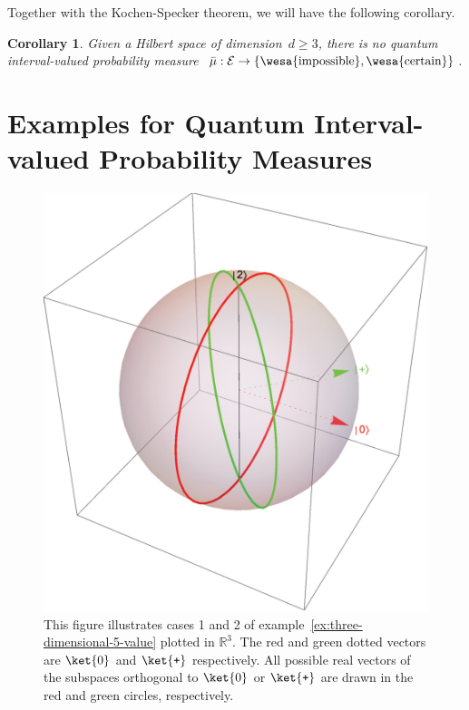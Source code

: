 \documentclass[12pt]{iopart}
\theoremstyle{plain}
\newtheorem{cor}[thm]{Corollary}
\theoremstyle{definition}
\theoremstyle{remark}
\newcommand{\events}{\ensuremath{\mathcal{E}}}
\newcommand{\imposs}{{\mbox{\wesa{impossible}}}}
\newcommand{\necess}{{\mbox{\wesa{certain}}}}
\newcommand{\ps}{\texttt{+}}
\begin{document}
Together with the Kochen-Specker theorem, we will have the following
corollary.

\begin{cor}\label{cor:Kochen-Specker-IVPM}Given a Hilbert space
of dimension~$d\ge3$, there is no quantum interval-valued probability
measure~$\bar{\mu}:\events\rightarrow\left\{ \imposs,\necess\right\} $.\end{cor}



\section{Examples for Quantum Interval-valued Probability Measures\label{sec:Examples-for-QuantumIVPM}}

\begin{figure}
\begin{centering}
\includegraphics[scale=0.38]{figureE1} 
\par\end{centering}
\caption{\label{fig:three-dimensional-5-value}This figure illustrates cases
1 and 2 of example~\ref{ex:three-dimensional-5-value} plotted in
$\mathbb{R}^{3}$. The red and green dotted vectors are $\ket{0}$
and $\ket{\ps}$ respectively. All possible real vectors of the subspaces
orthogonal to $\ket{0}$ or $\ket{\ps}$ are drawn in the red and
green circles, respectively.}
\end{figure}
\end{document}
